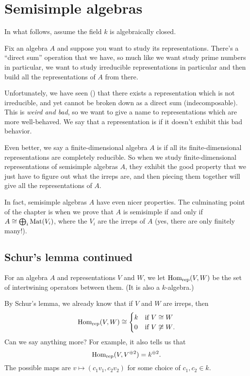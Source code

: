 \chapter{Semisimple algebras}
In what follows, assume the field $k$ is algebraically closed.

Fix an algebra $A$ and suppose
you want to study its representations.
There's a ``direct sum'' operation that we have,
so much like we want study prime numbers in particular,
we want to study irreducible representations in particular
and then build all the representations of $A$ from there.

Unfortunately, we have seen ()
that there exists a representation which is not irreducible,
and yet cannot be broken down as a direct sum (indecomposable).
This is \emph{weird and bad}, so we want to give a name
to representations which are more well-behaved.
We say that a representation is 
if it doesn't exhibit this bad behavior.

Even better, we say a finite-dimensional algebra $A$
is  if all its finite-dimensional
representations are completely reducible.
So when we study finite-dimensional representations of
semisimple algebras $A$, they exhibit the good property
that we just have to figure out what the irreps are,
and then piecing them together will give all
the representations of $A$.

In fact, semisimple algebras $A$ have even nicer properties.
The culminating point of the chapter is when we prove that
$A$ is semisimple if and only if $A \cong \bigoplus_i \mathrm{Mat}(V_i)$,
where the $V_i$ are the irreps of $A$
(yes, there are only finitely many!).

\section{Schur's lemma continued}
\begin{definition}
	For an algebra $A$ and representations $V$ and $W$,
	we let $\operatorname{Hom}_{\mathrm{rep}}(V,W)$ be the set of intertwining operators between them.
	(It is also a $k$-algebra.)
\end{definition}

By Schur's lemma, we already know that if $V$ and $W$ are irreps, then
\[
	\operatorname{Hom}_{\mathrm{rep}}(V,W) \cong
	\begin{cases}
		k & \text{if $V \cong W$} \\
		0 & \text{if $V \not\cong W$}.
	\end{cases}
\]
Can we say anything more?
For example, it also tells us that 
\[ \operatorname{Hom}_{\mathrm{rep}}(V, V^{\oplus 2}) = k^{\oplus 2}. \]
The possible maps are $v \mapsto (c_1v_1, c_2v_2)$ for some choice of $c_1, c_2 \in k$.

